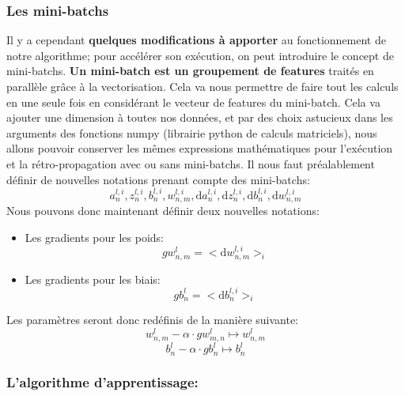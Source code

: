 \documentclass[12pt,a4paper]{extarticle}
\newcommand{\ud}{\mathrm{d}}
\begin{document}
\subsubsection{Les mini-batchs}
Il y a cependant \textbf{quelques modifications à apporter} au fonctionnement de notre algorithme; pour accélérer son exécution, on peut introduire le concept de mini-batchs. \textbf{Un mini-batch est un groupement de features} traités en parallèle grâce à la vectorisation. Cela va nous permettre de faire tout les calculs en une seule fois en considérant le vecteur de features du mini-batch.  Cela va ajouter une dimension à toutes nos données, et par des choix astucieux dans les arguments des fonctions numpy (librairie python de calculs matriciels), nous allons pouvoir conserver les mêmes expressions mathématiques pour l'exécution et la rétro-propagation avec ou sans mini-batchs. Il nous faut préalablement définir de nouvelles notations prenant compte des mini-batchs:
\[a^{l,i}_{n},z^{l,i}_{n},b^{l,i}_{n},w^{l,i}_{n,m},\ud a^{l,i}_{n},\ud z^{l,i}_{n},\ud b^{l,i}_{n},\ud w^{l,i}_{n,m}\]
Nous pouvons donc maintenant définir deux nouvelles notations:
\begin{itemize}
\item Les gradients pour les poids:
\[gw^l_{n,m}=<\ud w^{l,i}_{n,m}>_i\]
\item Les gradients pour les biais:
\[gb^l_{n}= <\ud b^{l,i}_n>_i\]
\end{itemize}

Les paramètres seront donc redéfinis de la manière suivante:
\begin{equation} w^l_{n,m} - \alpha \cdot gw^l_{m,n}\mapsto w^l_{n,m} \label{up_w} \end{equation}
\begin{equation} b^l_n - \alpha \cdot gb^l_n \mapsto b^l_n \label{up_b} \end{equation}

\subsubsection{L'algorithme d'apprentissage:}
\end{document}
